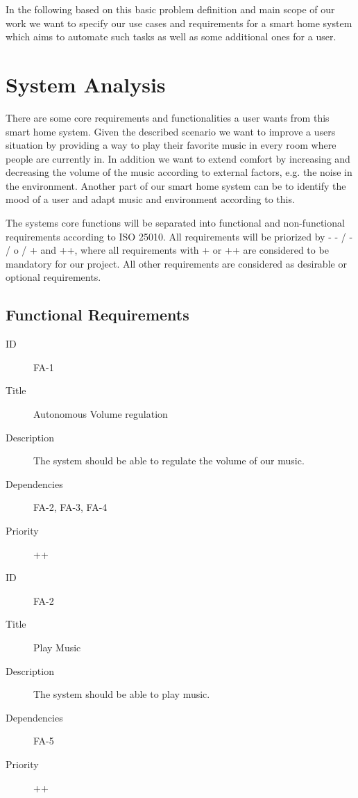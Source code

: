 \documentclass[runningheads]{llncs}
\begin{document}
In the following based on this basic problem definition and main scope of our work we want to specify our use cases and requirements for a smart home system which aims to automate such tasks as well as some additional ones for a user. 

\section{System Analysis}
There are some core requirements and functionalities a user wants from this smart home system. Given the described scenario we want to improve a users situation by providing a way to play their favorite music in every room where people are currently in. In addition we want to extend comfort by increasing and decreasing the volume of the music according to external factors, e.g. the noise in the environment. Another part of our smart home system can be to identify the mood of a user and adapt music and environment according to this.

The systems core functions will be separated into functional and non-functional requirements according to ISO 25010. All requirements will be priorized by - - / - / o / + and ++, where all requirements with + or ++ are considered to be mandatory for our project.  All other requirements are considered as desirable or optional requirements. 

\subsection{Functional Requirements}

\begin{description}
    \item[ID] FA-1
    \item[Title] Autonomous Volume regulation
    \item[Description] The system should be able to regulate the volume of our music.
    \item[Dependencies] FA-2, FA-3, FA-4
    \item[Priority] ++  
\end{description}

\begin{description}
    \item[ID] FA-2
    \item[Title] Play Music
    \item[Description] The system should be able to play music.
    \item[Dependencies] FA-5
    \item[Priority] ++
\end{description}
\end{document}
